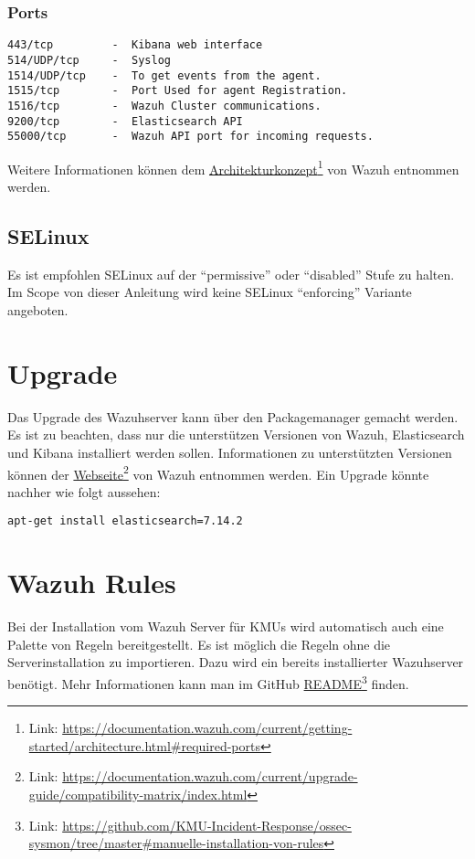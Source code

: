 \subsubsection{Ports}
\begin{lstlisting}
443/tcp         -  Kibana web interface
514/UDP/tcp     -  Syslog
1514/UDP/tcp    -  To get events from the agent.
1515/tcp        -  Port Used for agent Registration.
1516/tcp        -  Wazuh Cluster communications.
9200/tcp        -  Elasticsearch API
55000/tcp       -  Wazuh API port for incoming requests.
\end{lstlisting}




Weitere Informationen können dem \href{https://documentation.wazuh.com/current/getting-started/architecture.html\#required-ports}{Architekturkonzept}\footnote{Link: \href{https://documentation.wazuh.com/current/getting-started/architecture.html\#required-ports}{https://documentation.wazuh.com/current/getting-started/architecture.html\#required-ports}} von Wazuh entnommen werden.\\


\subsection{SELinux}
Es ist empfohlen SELinux auf der ``permissive'' oder ``disabled'' Stufe zu halten. Im Scope von dieser Anleitung wird keine SELinux ``enforcing'' Variante angeboten.

\section{Upgrade}
Das Upgrade des Wazuhserver kann über den Packagemanager gemacht werden.
Es ist zu beachten, dass nur die unterstützen Versionen von Wazuh, Elasticsearch und Kibana installiert werden sollen.
Informationen zu unterstützten Versionen können der \href{https://documentation.wazuh.com/current/upgrade-guide/compatibility-matrix/index.html}{Webseite}\footnote{Link: \href{https://documentation.wazuh.com/current/upgrade-guide/compatibility-matrix/index.html}{https://documentation.wazuh.com/current/upgrade-guide/compatibility-matrix/index.html}} von Wazuh entnommen werden. Ein Upgrade könnte nachher wie folgt aussehen:
\begin{lstlisting}
apt-get install elasticsearch=7.14.2
\end{lstlisting}


\section{Wazuh Rules}
Bei der Installation vom Wazuh Server für KMUs wird automatisch auch eine Palette von Regeln bereitgestellt.
Es ist möglich die Regeln ohne die Serverinstallation zu importieren.
Dazu wird ein bereits installierter Wazuhserver benötigt.
Mehr Informationen kann man im GitHub \href{https://github.com/KMU-Incident-Response/ossec-sysmon/tree/master\#manuelle-installation-von-rules}{README}\footnote{Link: \href{https://github.com/KMU-Incident-Response/ossec-sysmon/tree/master\#manuelle-installation-von-rules}{https://github.com/KMU-Incident-Response/ossec-sysmon/tree/master\#manuelle-installation-von-rules}} finden.


